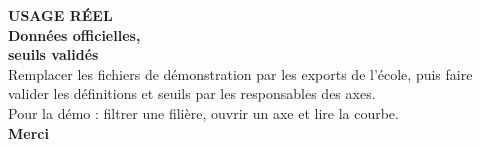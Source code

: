 \documentclass[aspectratio=169,12pt]{beamer}
\begin{document}
\begin{frame}[plain]
  \vspace{0.58cm}
  {\large\bfseries\color{ensiieOrange}USAGE RÉEL}\\[0.52cm]
  {\fontsize{31}{37}\selectfont\bfseries\color{white}Données officielles,\\ seuils validés}\\[0.54cm]
  {\Large\color{white}Remplacer les fichiers de démonstration par les exports de l'école, puis faire valider les définitions et seuils par les responsables des axes.}\\[0.66cm]
  {\large\color{white}Pour la démo : filtrer une filière, ouvrir un axe et lire la courbe.}\\[0.5cm]
  {\Large\bfseries\color{ensiieOrange}Merci}
\end{frame}
\end{document}
